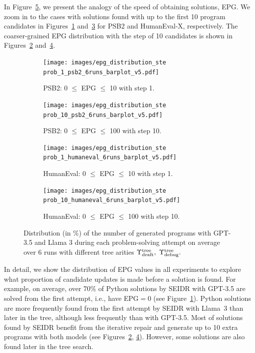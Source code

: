 In Figure~\ref{fig:epg-distribution}, we present the analogy of the speed of obtaining solutions, EPG. 
We zoom in to the cases with solutions found with up to the first 10 program candidates in Figures~\ref{fig:psb2-epg-distrib-step-1} and~\ref{fig:humaneval-epg-distrib-step-1} for PSB2 and HumanEval-X, respectively. 
The coarser-grained EPG distribution with the step of 10 candidates is shown in Figures~\ref{fig:psb2-epg-distrib-step-10} and~\ref{fig:humaneval-epg-distrib-step-10}. 


\begin{figure}
\begin{subfigure}{.8\columnwidth}
\centering
\texttt{[image: images/epg\_distribution\_ste\\prob\_1\_psb2\_6runs\_barplot\_v5.pdf]}
  \caption{PSB2: 0 $\leq$ EPG $\leq$ 10 with step 1.}
  \label{fig:psb2-epg-distrib-step-1}
\end{subfigure}
% 
% 
\begin{subfigure}{.8\columnwidth}
\centering
\texttt{[image: images/epg\_distribution\_ste\\prob\_10\_psb2\_6runs\_barplot\_v5.pdf]}
  \caption{PSB2: 0 $\leq$ EPG $\leq$ 100 with step 10.}
  \label{fig:psb2-epg-distrib-step-10}
\end{subfigure}
% 
\begin{subfigure}{.8\columnwidth}
\centering
\texttt{[image: images/epg\_distribution\_ste\\prob\_1\_humaneval\_6runs\_barplot\_v5.pdf]}
  \caption{HumanEval: 0 $\leq$ EPG $\leq$ 10 with step 1.}
  \label{fig:humaneval-epg-distrib-step-1}
\end{subfigure}
% 
\begin{subfigure}{.8\columnwidth}
\centering
\texttt{[image: images/epg\_distribution\_ste\\prob\_10\_humaneval\_6runs\_barplot\_v5.pdf]}
  \caption{HumanEval: 0 $\leq$ EPG $\leq$ 100 with step 10.}
  \label{fig:humaneval-epg-distrib-step-10}
\end{subfigure}
\caption{Distribution (in \%) of the number of generated programs with GPT-3.5 and Llama 3 during each problem-solving attempt on average over 6 runs with different tree arities $\Upsilon^\text{tree}_\text{draft}, \; \Upsilon^\text{tree}_\text{debug}.$}
\label{fig:epg-distribution}
\end{figure}



In detail, we show the distribution of EPG values in all experiments to explore what proportion of candidate updates is made before a solution is found.
For example, on average, over 70\% of Python solutions by SEIDR with GPT-3.5 are solved from the first attempt, i.e., have EPG$=0$ (see Figure~\ref{fig:psb2-epg-distrib-step-1}).
Python solutions are more frequently found from the first attempt by SEIDR with Llama~3 than later in the tree, although less frequently than with GPT-3.5.
Most of solutions found by SEIDR benefit from the iterative repair and generate up to 10 extra programs with both models (see Figures~\ref{fig:psb2-epg-distrib-step-10}, \ref{fig:humaneval-epg-distrib-step-10}). 
However, some solutions are also found later in the tree search. 

